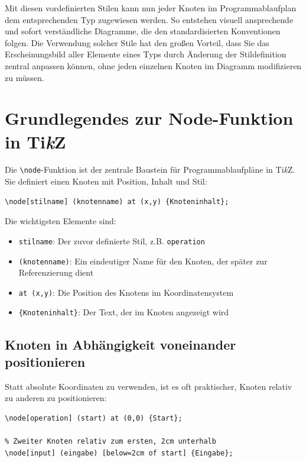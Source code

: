 Mit diesen vordefinierten Stilen kann nun jeder Knoten im Programmablaufplan dem entsprechenden Typ zugewiesen werden. So entstehen visuell ansprechende und sofort verständliche Diagramme, die den standardisierten Konventionen folgen. Die Verwendung solcher Stile hat den großen Vorteil, dass Sie das Erscheinungsbild aller Elemente eines Typs durch Änderung der Stildefinition zentral anpassen können, ohne jeden einzelnen Knoten im Diagramm modifizieren zu müssen.



\section{Grundlegendes zur Node-Funktion in Ti\textit{k}Z}

Die \texttt{\textbackslash node}-Funktion ist der zentrale Baustein für Programmablaufpläne in Ti\textit{k}Z. Sie definiert einen Knoten mit Position, Inhalt und Stil:

\begin{lstlisting}[style=latex]
\node[stilname] (knotenname) at (x,y) {Knoteninhalt};
\end{lstlisting}

Die wichtigsten Elemente sind:
\begin{itemize}
    \item \texttt{stilname}: Der zuvor definierte Stil, z.B. \texttt{operation}
    \item \texttt{(knotenname)}: Ein eindeutiger Name für den Knoten, der später zur Referenzierung dient
    \item \texttt{at (x,y)}: Die Position des Knotens im Koordinatensystem
    \item \texttt{\{Knoteninhalt\}}: Der Text, der im Knoten angezeigt wird
\end{itemize}



\subsection{Knoten in Abhängigkeit voneinander positionieren}

Statt absolute Koordinaten zu verwenden, ist es oft praktischer, Knoten relativ zu anderen zu positionieren:

\begin{lstlisting}[style=latex]
% Erster Knoten mit absoluter Position
\node[operation] (start) at (0,0) {Start};

% Zweiter Knoten relativ zum ersten, 2cm unterhalb
\node[input] (eingabe) [below=2cm of start] {Eingabe};
\end{lstlisting}

